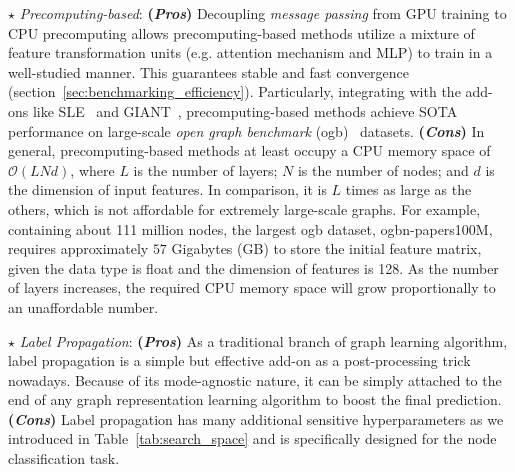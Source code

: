 \message{ !name(main.tex)}\documentclass{article}
\begin{document}
\(\star\) \textit{Precomputing-based}: \textbf{(\textit{Pros})} Decoupling \textit{message passing} from GPU training to CPU precomputing allows precomputing-based methods utilize a mixture of feature transformation units (e.g. attention mechanism and MLP) to train in a well-studied manner. This guarantees stable and fast convergence (section~\ref{sec:benchmarking_efficiency}). Particularly, integrating with the add-ons like SLE~\cite{sun2021scalable} and GIANT~\cite{chien2021node}, precomputing-based methods achieve SOTA performance on large-scale \textit{open graph benchmark} (ogb)~\cite{hu2020open} datasets. \textbf{(\textit{Cons})} In general, precomputing-based methods at least occupy a CPU memory space of \(\mathcal{O}(LNd)\), where \(L\) is the number of layers; \(N\) is the number of nodes; and \(d\) is the dimension of input features. In comparison, it is \(L\) times as large as the others, which is not affordable for extremely large-scale graphs. For example, containing about 111 million nodes, the largest ogb dataset, ogbn-papers100M, requires approximately \(57\) Gigabytes (GB) to store the initial feature matrix, given the data type is float and the dimension of features is 128. As the number of layers increases, the required CPU memory space will grow proportionally to an unaffordable number.

\(\star\) \textit{Label Propagation}: \textbf{(\textit{Pros})} As a traditional branch of graph learning algorithm, label propagation is a simple but effective add-on as a post-processing trick nowadays. Because of its mode-agnostic nature, it can be simply attached to the end of any graph representation learning algorithm to boost the final prediction. \textbf{(\textit{Cons})} Label propagation has many additional sensitive hyperparameters as we introduced in Table~\ref{tab:search_space} and is specifically designed for the node classification task.

\vspace{-2mm}
\end{document}
